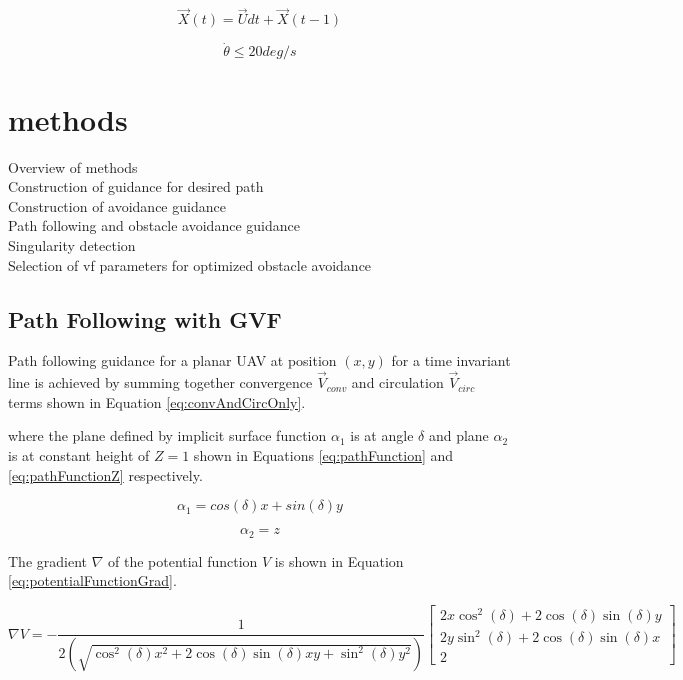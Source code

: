\documentclass[conf]{new-aiaa}
\begin{document}
\begin{equation}
\label{uavPosition}
\overrightarrow{X}(t) = \overrightarrow{U}dt + \overrightarrow{X}(t-1)
\end{equation}


\begin{equation}
\label{turnRate}
\dot{\theta} \leq 20 deg/s
\end{equation}




\section{methods}
Overview of methods \\
Construction of guidance for desired path \\
Construction of avoidance guidance \\
Path following and obstacle avoidance guidance \\
Singularity detection \\
Selection of vf parameters for optimized obstacle avoidance \\

\subsection{Path Following with GVF}
Path following guidance for a planar UAV at position $(x,y)$ for a time invariant line is achieved by summing together convergence $\overrightarrow{V}_{conv}$ and circulation $\overrightarrow{V}_{circ}$ terms shown in Equation \ref{eq:convAndCircOnly}.


where the plane defined by implicit surface function $\alpha_1$ is at angle $\delta$ and plane $\alpha_2$ is at constant height of $Z = 1$ shown in Equations \ref{eq:pathFunction} and \ref{eq:pathFunctionZ} respectively.


\begin{equation}
\label{eq:pathFunction}
\alpha_1 = cos(\delta)x + sin(\delta)y
\end{equation}

\begin{equation}
\label{eq:pathFunctionZ}
\alpha_2 = z
\end{equation}

The gradient $\nabla$ of the potential function $V$ is shown in Equation \ref{eq:potentialFunctionGrad}.

\begin{equation}
\label{eq:potentialFunctionGrad}
\nabla V = -\frac{1}{2(\sqrt{\cos^2(\delta) x^2+2\cos(\delta)\sin(\delta) xy +\sin^2 (\delta) y^2})} \begin{bmatrix}
2x\cos^2(\delta) + 2\cos(\delta)\sin(\delta) y \\
2y\sin^2(\delta) + 2\cos(\delta)\sin(\delta) x \\
2
\end{bmatrix}
\end{equation}
\end{document}
